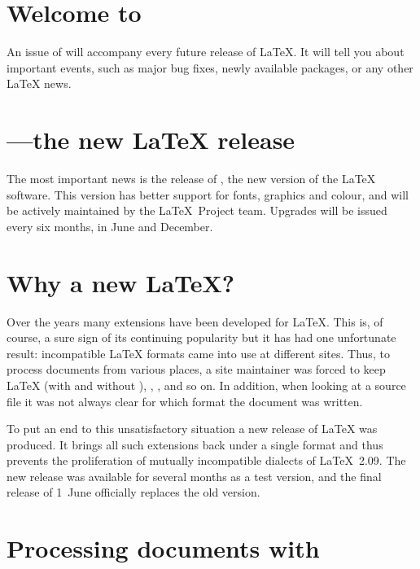 \documentclass{ltnews}
\begin{document}
\maketitle

\section{Welcome to \LaTeXNews}

An issue of \emph{\LaTeXNews} will accompany every future release of
\LaTeX.  It will tell you about important events, such as major bug
fixes, newly available packages, or any other \LaTeX{} news.

\section{\LaTeXe---the new \LaTeX{} release}

The most important news is the release of \LaTeXe, the new version of
the \LaTeX{} software.  This version has better support for fonts,
graphics and colour, and will be actively maintained by the \LaTeX\
Project team.  Upgrades will be issued every six months, in June and
December.

\section{Why a new \LaTeX?}

Over the years many extensions have been developed for \LaTeX. This
is, of course, a sure sign of its continuing popularity but it has had
one unfortunate result: incompatible \LaTeX{} formats came into use at
different sites. Thus, to process documents from various places, a
site maintainer was forced to keep \LaTeX{} (with and without \NFSS),
\SLiTeX, \AmSLaTeX, and so on.  In addition, when looking at a source
file it was not always clear for which format the document was written.

To put an end to this unsatisfactory
situation a new release of \LaTeX{} was produced.
It brings all such extensions back under a single format and thus
prevents the proliferation of mutually incompatible dialects of
\LaTeX~2.09. The new release was available for several months as a
test version, and the final release of 1~June officially
replaces the old version.

\section{Processing documents with \LaTeXe}
\end{document}
